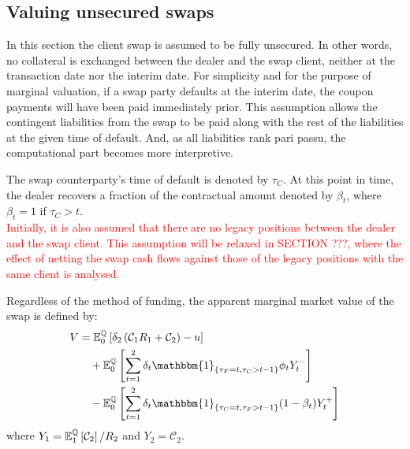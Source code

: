 \documentclass[main.tex]{subfiles}
\begin{document}
    \subsection{Valuing unsecured swaps}
        In this section the client swap is assumed to be fully unsecured.
        In other words, no collateral is exchanged between the dealer and the swap client, 
        neither at the transaction date nor the interim date.
        For simplicity and for the purpose of marginal valuation,
        if a swap party defaults at the interim date, the coupon payments will have been paid immediately prior.
        This assumption allows the contingent liabilities from the swap to be paid along with the rest of the liabilities at the given time of default.
        And, as all liabilities rank pari passu, the computational part becomes more interpretive.

        The swap counterparty's time of default is denoted by $\tau_{C}$.
        At this point in time, the dealer recovers a fraction of the contractual amount denoted by $\beta_{t}$, where $\beta_{t} = 1$ if $\tau_{C}>t$.
        \\
        \textcolor{red}{Initially, it is also assumed that there are no legacy positions between the dealer and the swap client.
        This assumption will be relaxed in SECTION ???, where the effect of netting the swap cash flows against those of the legacy positions with the same client is analysed.}

        Regardless of the method of funding, the apparent marginal market value of the swap is defined by:
        \begin{align}
            V &=
            \mathbb{E}_{0}^{\rnmeasure}\left[
                \delta_2 \left(\mathcal{C}_{1} R_{1} + \mathcal{C}_{2}\right)
                - u
            \right]
            \nonumber
            \\
            &\quad +
            \mathbb{E}_{0}^{\rnmeasure}\left[
                \sum_{t=1}^{2} \delta_{t} \mathbbm{1}_{\{\tau_{F} = t,\tau_{C}>t-1\}} \phi_t Y_{t}^{-} 
            \right]
            \nonumber
            \\
            &\quad -
            \mathbb{E}_{0}^{\rnmeasure}\left[
                \sum_{t=1}^{2} \delta_{t} \mathbbm{1}_{\{\tau_{C} = t,\tau_{F}>t-1\}} (1-\beta_t) Y_{t}^{+} 
            \right]
            \label{eqn:swap-value-multi-period}
        \end{align}
        where $Y_{1} = \mathbb{E}_{1}^{\mathbb{Q}}\left[\mathcal{C}_{2}\right]/R_{2}$ and $Y_{2} = \mathcal{C}_{2}$.
\end{document}
